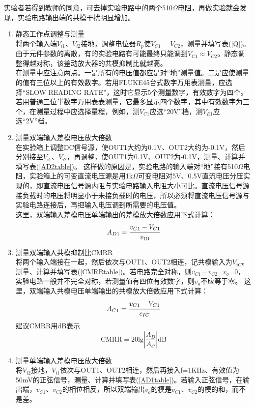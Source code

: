 \documentclass[a4paper]{article}
\begin{document}
实验者若得到教师的同意，可去掉实验电路中的两个510$\Omega$电阻，再做实验就会发现，实验电路输出端的共模干扰明显增加。
\begin{enumerate}
\item 静态工作点调整与测量\\
将两个输入端$V_{i1}$、$V_{i2}$接地，调整电位器$R_p$使$V_{C1} = V_{C2}$，测量并填写表(\ref{Q})。由于元件参数的离散，有的实验电路有可能最终只能调到$V_{C1} \approx V_{C2}$。静态调整得越对称，该差动放大器的共模抑制比就越高。\\
在测量中应注意两点。一是所有的电压值都应是对“地”测量值。二是应使测量的值有三位以上的有效数字。若用FLUKE45台式数字万用表测量，应选择“SLOW READING RATE”，这时它显示5个测量数字，有效数字为四个。若用普通三位半数字万用表表测量，它最多显示四个数字，其中有效数字为三个，在测量过程中应选择量程，例如，测$V_{C1}$应选“20V”档，测$V_{E1}$应选“2V”档。
\item 测量双端输入差模电压放大倍数\\
在实验箱上调整DC信号源，使OUT1大约为0.1V、OUT2大约为-0.1V，然后分别接至$V_{i1}$、$V_{i2}$，再调整，使OUT1为0.1V、OUT2为-0.1V，测量、计算并填写表(\ref{AD2table})。
这样做的原因是，实验电路的输入端对“地”接有510$\Omega$电阻，实验箱上的可变直流电压源是用1k$\Omega$可变电阻对5V、0.5V直流电压分压实现的，即直流电压信号源内阻与实验电路输入电阻大小可比。直流电压信号源接负载时的电压将明显小于未接负载时的电压，所以必须将直流电压信号源与实验电路连接后，再把输入电压调到所需要的电压值。\\
这里，双端输入差模电压单端输出的差模放大倍数应用下式计算：
\begin{equation}
A_{D1} = \cfrac{v_{C1}-V_{C1}}{v_{\text{ID}}}\label{AD1}
\end{equation}
\item 测量双端输入共模抑制比CMRR\\
将两个输入端接在一起，然后依次与OUT1、OUT2相连，记共模输入为$V_{iC}$。测量、计算并填写表(\ref{CMRRtable})。若电路完全对称，则$v_{C1}$－$v_{C2}$=$v_o$=0，实验电路一般并不完全对称，若测量值有四位有效数字，则$v_o$不应等于零。
这里，双端输入共模电压单端输出的共模放大倍数应用下式计算：
\begin{equation}
A_{C1} = \cfrac{v_{C1}-V_{C1}}{c_{IC}}
\end{equation}
建议CMRR用dB表示
\begin{equation}
\text{CMRR} = 20\text{lg}\left|\frac{A_D}{A_C}\right|\text{dB}
\end{equation}
\item 测量单端输入差模电压放大倍数\\
将$V_{i2}$接地，$V_{i1}$依次与OUT1、OUT2相连，然后再接入f=1KHz、有效值为50mV的正弦信号，测量、计算并填写表(\ref{AD1table})。若输入正弦信号，在输出端，$v_{C1}$、$v_{C2}$的相位相反，所以双端输出$v_o$的模是$v_{C1}$、$v_{C2}$的模的和，而不是差。
\end{enumerate}
\end{document}
